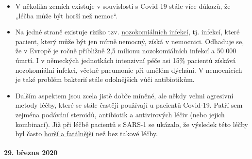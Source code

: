\begin{itemize}
\tightlist
\item
  V několika zemích existuje v souvislosti s Covid-19 stále více důkazů,
  že „léčba může být horší než nemoc``.
\item
  Na jedné straně existuje riziko tzv.
  \href{https://en.wikipedia.org/wiki/Hospital-acquired_infection}{nozokomiálních
  infekcí}, tj. infekcí, které pacient, který může být jen mírně
  nemocný, získá v nemocnici. Odhaduje se, že v Evropě je ročně
  přibližně 2,5 milionu nozokomiálních infekcí a 50 000 úmrtí. I v
  německých jednotkách intenzivní péče asi 15\% pacientů získává
  nozokomiální infekci, včetně pneumonie při umělém dýchání. V
  nemocnicích je také problém bakterií stále odolnějších vůči
  antibiotikům.
\item
  Dalším aspektem jsou zcela jistě dobře míněné, ale někdy velmi
  agresivní metody léčby, které se stále častěji používají u pacientů
  Covid-19. Patří sem zejména podávání steroidů, antibiotik a
  antivirových léčiv (nebo jejich kombinací). Již při léčbě pacientů s
  SARS-1 se ukázalo, že výsledek této léčby byl často
  \href{https://www.sciencedaily.com/releases/2020/02/200206110703.htm}{horší
  a fatálnější} než bez takové léčby.\\
\end{itemize}

\hypertarget{29-bux159ezna-2020}{%
\paragraph{29. března 2020}\label{29-bux159ezna-2020}}

